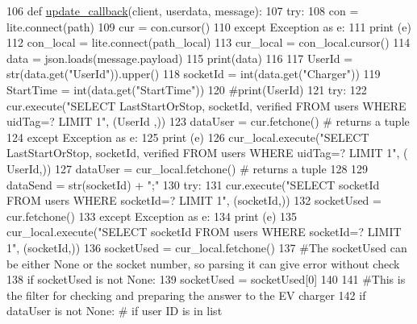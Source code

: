 \begin{DoxyCode}
106 \textcolor{keyword}{def }\hyperlink{namespace_s_q_lfunction_ae16644514ae2cdbf375884361531f691}{update\_callback}(client, userdata, message):
107     \textcolor{keywordflow}{try}:
108         con = lite.connect(path)
109         cur = con.cursor()
110     \textcolor{keywordflow}{except} Exception \textcolor{keyword}{as} e:
111         \textcolor{keywordflow}{print} (e)
112     con\_local = lite.connect(path\_local)
113     cur\_local = con\_local.cursor()
114     data = json.loads(message.payload)
115     print(data)
116     
117     UserId = str(data.get(\textcolor{stringliteral}{"UserId"})).upper()
118     socketId = int(data.get(\textcolor{stringliteral}{"Charger"}))
119     StartTime = int(data.get(\textcolor{stringliteral}{"StartTime"}))
120     \textcolor{comment}{#print(UserId)}
121     \textcolor{keywordflow}{try}:
122         cur.execute(\textcolor{stringliteral}{"SELECT LastStartOrStop, socketId, verified FROM users WHERE uidTag=? LIMIT 1"}, (UserId
      ,))
123         dataUser = cur.fetchone() \textcolor{comment}{# returns a tuple}
124     \textcolor{keywordflow}{except} Exception \textcolor{keyword}{as} e:
125         \textcolor{keywordflow}{print} (e)
126         cur\_local.execute(\textcolor{stringliteral}{"SELECT LastStartOrStop, socketId, verified FROM users WHERE uidTag=? LIMIT 1"}, (
      UserId,))
127         dataUser = cur\_local.fetchone() \textcolor{comment}{# returns a tuple}
128     
129     dataSend = str(socketId) + \textcolor{stringliteral}{";"}
130     \textcolor{keywordflow}{try}:
131         cur.execute(\textcolor{stringliteral}{"SELECT socketId FROM users WHERE socketId=? LIMIT 1"}, (socketId,))
132         socketUsed = cur.fetchone()
133     \textcolor{keywordflow}{except} Exception \textcolor{keyword}{as} e:
134         \textcolor{keywordflow}{print} (e)
135         cur\_local.execute(\textcolor{stringliteral}{"SELECT socketId FROM users WHERE socketId=? LIMIT 1"}, (socketId,))
136         socketUsed = cur\_local.fetchone()
137     \textcolor{comment}{#The socketUsed can be either None or the socket number, so parsing it can give error without check}
138     \textcolor{keywordflow}{if} socketUsed \textcolor{keywordflow}{is} \textcolor{keywordflow}{not} \textcolor{keywordtype}{None}:
139         socketUsed = socketUsed[0]
140         
141     \textcolor{comment}{#This is the filter for checking and preparing the answer to the EV charger}
142     \textcolor{keywordflow}{if} dataUser \textcolor{keywordflow}{is} \textcolor{keywordflow}{not} \textcolor{keywordtype}{None}: \textcolor{comment}{# if user ID is in list}

\end{DoxyCode}
